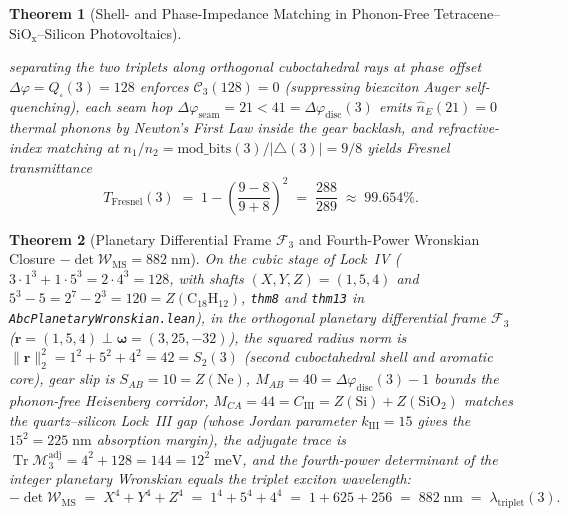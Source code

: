 \documentclass[11pt,a4paper]{article}
\theoremstyle{plain}
\newtheorem{theorem}{Theorem}[section]
\theoremstyle{definition}
\begin{document}
\begin{theorem}[Shell- and Phase-Impedance Matching in Phonon-Free Tetracene--$\mathrm{SiO_x}$--Silicon Photovoltaics]
\begin{enumerate}[label=\textbf{(\roman*)},leftmargin=*]
  separating the two triplets along orthogonal cuboctahedral rays at phase offset $\Delta\varphi = Q_\square(3) = 128$ enforces $\mathcal{C}_3(128) = 0$ (suppressing biexciton Auger self-quenching), each seam hop $\Delta\varphi_{\mathrm{seam}} = 21 < 41 = \Delta\varphi_{\mathrm{disc}}(3)$ emits $\hat{n}_E(21) = 0$ thermal phonons by Newton's First Law inside the gear backlash, and refractive-index matching at $n_1/n_2 = \mathrm{mod\_bits}(3)/|{\triangle}(3)| = 9/8$ yields Fresnel transmittance
  \[
    T_{\mathrm{Fresnel}}(3) \;=\; 1 - \left(\frac{9-8}{9+8}\right)^2 \;=\; \frac{288}{289} \;\approx\; 99.654\%.
  \]
\end{enumerate}
\end{theorem}

\begin{theorem}[Planetary Differential Frame $\mathcal{F}_3$ and Fourth-Power Wronskian Closure $-\det\mathcal{W}_{\mathrm{MS}} = 882\;\text{nm}$]
\label{thm:solar-wronskian-882}
On the cubic stage of Lock~IV ($3\cdot 1^3 + 1\cdot 5^3 = 2\cdot 4^3 = 128$, with shafts $(X,Y,Z) = (1,5,4)$ and $5^3 - 5 = 2^7 - 2^3 = 120 = Z(\mathrm{C_{18}H_{12}})$, \texttt{thm8} and \texttt{thm13} in \texttt{AbcPlanetaryWronskian.lean}), in the orthogonal planetary differential frame $\mathcal{F}_3$ ($\mathbf{r} = (1,5,4)\perp\mathbf{\omega} = (3,25,-32)$), the squared radius norm is $\|\mathbf{r}\|_2^2 = 1^2 + 5^2 + 4^2 = 42 = S_2(3)$ (second cuboctahedral shell and aromatic core), gear slip is $S_{AB} = 10 = Z(\mathrm{Ne})$, $M_{AB} = 40 = \Delta\varphi_{\mathrm{disc}}(3) - 1$ bounds the phonon-free Heisenberg corridor, $M_{CA} = 44 = C_{\mathrm{III}} = Z(\mathrm{Si}) + Z(\mathrm{SiO_2})$ matches the quartz--silicon Lock~III gap (whose Jordan parameter $k_{\mathrm{III}} = 15$ gives the $15^2 = 225\;\text{nm}$ absorption margin), the adjugate trace is $\operatorname{Tr}\mathcal{M}_3^{\mathrm{adj}} = 4^2 + 128 = 144 = 12^2\;\text{meV}$, and the fourth-power determinant of the integer planetary Wronskian equals the triplet exciton wavelength:
\begin{equation}
  \label{eq:wms-882}
  -\det\mathcal{W}_{\mathrm{MS}} \;=\; X^4 + Y^4 + Z^4 \;=\; 1^4 + 5^4 + 4^4 \;=\; 1 + 625 + 256 \;=\; 882\;\text{nm} \;=\; \lambda_{\mathrm{triplet}}(3).
\end{equation}
\end{theorem}
\end{document}
